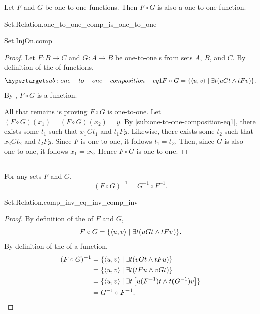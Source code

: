 \documentclass{report}
\begin{document}
  \begin{lemma}
    Let $F$ and $G$ be one-to-one functions.
    Then $F \circ G$ is also a one-to-one function.
  \end{lemma}

    {Set.Relation.one\_to\_one\_comp\_is\_one\_to\_one}

    {Set.InjOn.comp}

  \begin{proof}
    Let $F \colon B \rightarrow C$ and $G \colon A \rightarrow B$ be
      one-to-one s from sets $A$, $B$, and $C$.
    By definition of the  of functions,
      \begin{equation}
        \hyperlabel{sub:one-to-one-composition-eq1}
        F \circ G = \{\tuple{u, v} \mid \exists t(uGt \land tFv)\}.
      \end{equation}
    By , $F \circ G$ is a function.

    All that remains is proving $F \circ G$ is one-to-one.
    Let $(F \circ G)(x_1) = (F \circ G)(x_2) = y$.
    By \eqref{sub:one-to-one-composition-eq1}, there exists some $t_1$ such that
      $x_1Gt_1$ and $t_1Fy$.
    Likewise, there exists some $t_2$ such that $x_2Gt_2$ and $t_2Fy$.
    Since $F$ is one-to-one, it follows $t_1 = t_2$.
    Then, since $G$ is also one-to-one, it follows $x_1 = x_2$.
    Hence $F \circ G$ is one-to-one.
  \end{proof}

\subsection{}%

  \begin{theorem}[3I]
    For any sets $F$ and $G$, $$(F \circ G)^{-1} = G^{-1} \circ F^{-1}.$$
  \end{theorem}

    {Set.Relation.comp\_inv\_eq\_inv\_comp\_inv}

  \begin{proof}
    By definition of the  of $F$ and $G$,
      $$F \circ G = \{\left< u, v \right> \mid \exists t(uGt \land tFv)\}.$$
    By definition of the  of a function,
      \begin{align*}
        (F \circ G)^{-1}
          & = \{\left< u, v \right> \mid \exists t (vGt \land tFu)\} \\
          & = \{\left< u, v \right> \mid \exists t (tFu \land vGt)\} \\
          & = \{\left< u, v \right> \mid
            \exists t \left[ u(F^{-1})t \land t(G^{-1})v \right]\} \\
          & = G^{-1} \circ F^{-1}.
      \end{align*}
  \end{proof}
\end{document}
